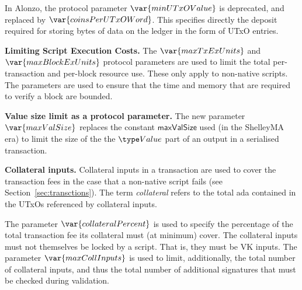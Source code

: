 In Alonzo, the protocol parameter $\var{minUTxOValue}$ is deprecated, and replaced by
$\var{coinsPerUTxOWord}$. This specifies directly the deposit required for storing
bytes of data on the ledger in the form of UTxO entries.

\textbf{Limiting Script Execution Costs.}
The $\var{maxTxExUnits}$ and $\var{maxBlockExUnits}$ protocol parameters are
used to limit the total per-transaction and per-block resource use. These only apply to non-native scripts.
The parameters are used to ensure that the time and memory that are required to verify a block are bounded.

\textbf{Value size limit as a protocol parameter.}
The new parameter $\var{maxValSize}$ replaces the constant $\mathsf{maxValSize}$
used (in the ShelleyMA era) to limit the size of the the $\Value$ part of an output in a
serialised transaction.

\textbf{Collateral inputs.}
Collateral inputs in a transaction are used to cover the transaction fees in the case
that a non-native script fails (see Section~\ref{sec:transctions}).
The term \emph{collateral} refers to the total ada contained in the UTxOs referenced 
by collateral inputs.

The parameter $\var{collateralPercent}$ is used to specify the percentage of
the total transaction fee its collateral must (at minimum) cover. The
collateral inputs must not themselves be locked by a script. That is, they must
be VK inputs. The parameter $\var{maxCollInputs}$ is used to limit, additionally,
the total number of collateral inputs, and thus the total number of additional
signatures that must be checked during validation.


